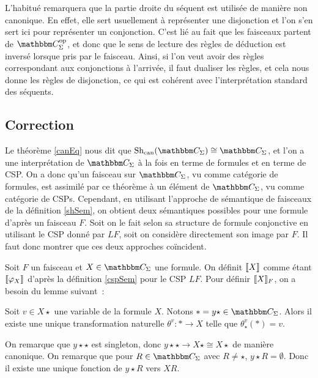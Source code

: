 \begin{rem}
    L'habitué remarquera que la partie droite du séquent est utilisée de manière non
    canonique. En effet, elle sert usuellement à représenter une disjonction et
    l'on s'en sert ici pour représenter un conjonction. C'est lié au fait que
    les faisceaux partent de $\C_\Sigma^\text{op}$, et donc que le sens de lecture
    des règles de déduction est inversé lorsque pris par le faisceau. Ainsi, si l'on
    veut avoir des règles correspondant aux conjonctions à l'arrivée, il faut dualiser
    les règles, et cela nous donne les règles de disjonction, ce qui est cohérent avec
    l'interprétation standard des séquents.
\end{rem}


\subsection{Correction}

Le théorème \ref{canEq} nous dit que $\shc(\C_\Sigma)\cong \C_\Sigma$, et l'on a
une interprétation de $\C_\Sigma$ à la fois en terme de formules et en terme de
CSP.  On a donc qu'un faisceau sur $\C_\Sigma$, vu comme catégorie de formules,
est assimilé par ce théorème à un élément de $\C_\Sigma$, vu comme catégorie de
CSPs.  Cependant, en utilisant l'approche de sémantique de faisceaux de la
définition \ref{shSem}, on obtient deux sémantiques possibles pour une formule
d'après un faisceau $F$.  Soit on le fait selon sa structure de formule
conjonctive en utilisant le CSP donné par $LF$, soit on considère directement
son image par $F$. Il faut donc montrer que ces deux approches coïncident.

Soit $F$ un faisceau et $X\in\C_\Sigma$ une formule. On définit $\llbracket {X} \rrbracket$ comme
étant $\llbracket {\varphi_X} \rrbracket$ d'après la définition \ref{cspSem} pour le CSP $LF$. Pour
définir $\llbracket {X} \rrbracket_F$, on a besoin du lemme suivant~:

\begin{lem}
    Soit $v\in X\star$ une variable de la formule $X$. Notons
    $\ast = y\star\in\C_\Sigma$. Alors il existe une unique transformation naturelle
    $\theta^v : \ast\rightarrow X$ telle que $\theta^v_\star(*) = v$.
\end{lem}

\begin{pv}
    On remarque que $y\star\star$ est singleton, donc
    $y\star\star\rightarrow X\star\cong X\star$ de manière canonique. On remarque que pour
    $R\in\C_\Sigma$ avec $R\neq\star$, $y\star R=\emptyset$. Donc il existe une unique
    fonction de $y\star R$ vers $X R$. 
\end{pv}

